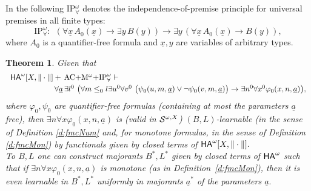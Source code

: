\documentclass[1p]{elsarticle}
\newcommand{\usftext}[1]{\textsf{\upshape #1}}
\newcommand{\ba}{\begin{array}} \newcommand{\ea}{\end{array}}
\newcommand{\ha}{\ensuremath{{\usftext{HA}}^\omega}} %
\newcommand{\tup}{\underline} %
\theoremstyle{plain}
\newtheorem{thm}{Theorem}[section]
\theoremstyle{definition}
\theoremstyle{remark}
\renewcommand{\phi}{\varphi}
\theoremstyle{definition}
\begin{document}
{In the following IP$^{\omega}_{\forall}$ denotes 
the independence-of-premise principle for universal 
premises in all finite types:
\[\mbox{IP}^{\omega}_{\forall}: \ \ (\forall \underline{x}\,A_0(\underline{x})
\to\exists y \,
B(y))\rightarrow \exists y\,( \forall \underline{x}\,
A_0(\underline{x})\to B(y)), \]
where $A_0$ is a quantifier-free formula and $\underline{x},y$ are 
variables of 
arbitrary types.
\begin{thm}\label{t:bdLem}
Given that
\[ \ba{l} 
\ha[X,\|\cdot\|]+\, \mbox{\rm AC$+$M$^{\omega}+$IP}^{\omega}_{\forall} 
\vdash\\[1mm] \hspace*{2cm} \forall \underline{a}\,\exists l^0\ \big( 
\forall m\leq_0 l \exists u^0 \forall v^0\ 
\big(\psi_0(u,m,\tup a) \vee \neg\psi_0(v,m,\tup a)\big)\rightarrow \exists 
n^0 \forall x^0 \phi_0(x,n,\tup a)\big),\ea 
\]
where $\phi_0,\psi_0$ are quantifier-free formulas (containing at most the 
parameters $\underline{a}$ free), 
then $\exists n\forall x \phi_0(x,n,\tup a)$ 
is (valid in ${\cal S}^{\omega,X}$) $(B,L)$-learnable (in the sense 
of Definition \ref{d:fmcNum} and, for monotone formulas, in the 
sense of Definition \ref{d:fmcMon}) by functionals given by 
closed terms of $\ha[X,\|\cdot\|].$ \\
To $B,L$ one can construct majorants 
$B^*,L^*$ given by closed terms of $\ha$ such that 
if $\exists n\forall x \phi_0(x,n,\tup a)$ is monotone (as in 
Definition~\ref{d:fmcMon}), then it is even learnable in $B^*,L^*$ uniformly in majorants $\underline{a}^*$ of the parameters $\underline{a}.$
\end{thm}

}
\end{document}
